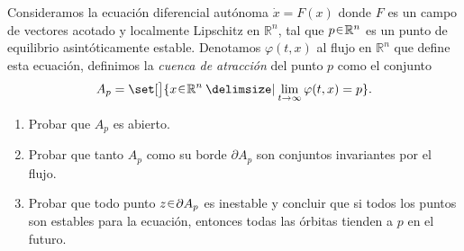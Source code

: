 \begin{ejer}
Consideramos la ecuación diferencial autónoma $\dot{x} = F(x)$ donde $F$ es un campo de vectores acotado y localmente Lipschitz en $\mathbb{R}^n$, tal que $p \en \mathbb{R}^n$ es un punto de equilibrio asintóticamente estable. Denotamos $\varphi(t,x)$ al flujo en $\mathbb{R}^n$ que define esta ecuación, definimos la \textit{cuenca de atracción} del punto $p$ como el conjunto
\[
A_p = \set[\big]{ x \en \mathbb{R}^n \given \lim_{t \to \infty} \varphi(t,x) = p }.
\]
\begin{enumerate}[label=(\alph*)]
\item Probar que $A_p$ es abierto.

\item Probar que tanto $A_p$ como su borde $\partial A_p$ son conjuntos invariantes por el flujo.

\item Probar que todo punto $z \en \partial A_p$ es inestable y concluir que si todos los puntos son estables para la ecuación, entonces todas las órbitas tienden a $p$ en el futuro.
\end{enumerate}
\end{ejer}
